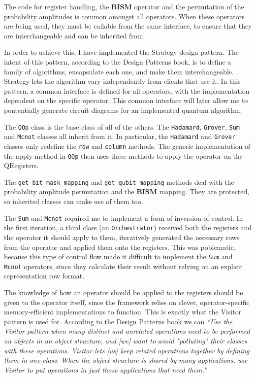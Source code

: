 The code for register handling, the \textbf{BISM} operator and the permutation of the probability amplitudes is common amongst all operators. When these operators are being used, they must be callable from the same interface, to ensure that they are interchangeable and can be inherited from.

In order to achieve this, I have implemented the Strategy design pattern. The intent of this pattern, according to the Design Patterns book\cite{DesignPatterns}, is to define a family of algorithms, encapsulate each one, and make them interchangeable. Strategy lets the algorithm vary independently from clients that use it. In this pattern, a common interface is defined for all operators, with the implementation dependent on the specific operator. This common interface will later allow me to pontentially generate circuit diagrams for an implemented quantum algorithm.

The \texttt{QOp} class is the base class of all of the others. The \texttt{Hadamard}, \texttt{Grover}, \texttt{Sum} and \texttt{Mcnot} classes all inherit from it. In particular, the \texttt{Hadamard} and \texttt{Grover} classes only redefine the \texttt{row} and \texttt{column} methods. The generic implementation of the apply method in \texttt{QOp} then uses these methods to apply the operator on the QRegisters.

The \texttt{get\_bit\_mask\_mapping} and \texttt{get\_qubit\_mapping} methods deal with the probability amplitude permutation and the \textbf{BISM} mapping. They are protected, so inherited classes can make use of them too.

The \texttt{Sum} and \texttt{Mcnot} required me to implement a form of inversion-of-control. In the first iteration, a third class (an \texttt{Orchestrator}) received both the registers and the operator it should apply to them, iteratively generated the necessary rows from the operator and applied them onto the registers. This was poblematic, because this type of control flow made it difficult to implement the \texttt{Sum} and \texttt{Mcnot} operators, since they calculate their result without relying on an explicit representation row format.

The knowledge of how an operator should be applied to the registers should be given to the operator itself, since the framework relies on clever, operator-specific memory-efficient implementations to function. This is exactly what the Visitor pattern is used for. According to the Design Patterns book\cite{DesignPatterns} we can \textit{``Use the Visitor pattern when many distinct and unrelated operations need to be performed on objects in an object structure, and [we] want to avoid "polluting" their classes with these operations. Visitor lets [us] keep related operations together by defining them in one class. When the object structure is shared by many applications, use Visitor to put operations in just those applications that need them.''}
